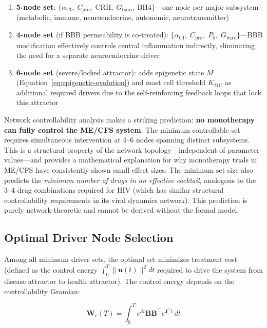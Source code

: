 \begin{enumerate}
    \item \textbf{5-node set}: $\{\alpha_{\text{CI}},\; C_{\text{pro}},\; \text{CRH},\; G_{\text{baro}},\; \text{BH4}\}$---one node per major subsystem (metabolic, immune, neuroendocrine, autonomic, neurotransmitter)
    \item \textbf{4-node set} (if BBB permeability is co-treated): $\{\alpha_{\text{CI}},\; C_{\text{pro}},\; P_0,\; G_{\text{baro}}\}$---BBB modification effectively controls central inflammation indirectly, eliminating the need for a separate neuroendocrine driver
    \item \textbf{6-node set} (severe/locked attractor): adds epigenetic state $M$ (Equation~\ref{eq:epigenetic-evolution}) and mast cell threshold $K_{\text{MC}}$ as additional required drivers due to the self-reinforcing feedback loops that lock this attractor
\end{enumerate}

\begin{modelunique}
Network controllability analysis makes a striking prediction: \textbf{no monotherapy can fully control the ME/CFS system}. The minimum controllable set requires simultaneous intervention at 4--6 nodes spanning distinct subsystems. This is a structural property of the network topology---independent of parameter values---and provides a mathematical explanation for why monotherapy trials in ME/CFS have consistently shown small effect sizes. The minimum set size also predicts the \emph{minimum number of drugs in an effective cocktail}, analogous to the 3--4 drug combinations required for HIV (which has similar structural controllability requirements in its viral dynamics network). This prediction is purely network-theoretic and cannot be derived without the formal model.
\end{modelunique}

\subsection{Optimal Driver Node Selection}

Among all minimum driver sets, the optimal set minimizes treatment cost (defined as the control energy $\int_0^T \|\mathbf{u}(t)\|^2 dt$ required to drive the system from disease attractor to health attractor). The control energy depends on the controllability Gramian:

\begin{equation}
\label{eq:controllability-gramian}
\mathbf{W}_c(T) = \int_0^T e^{\mathbf{J}t} \mathbf{B} \mathbf{B}^\top e^{\mathbf{J}^\top t} \, dt
\end{equation}


